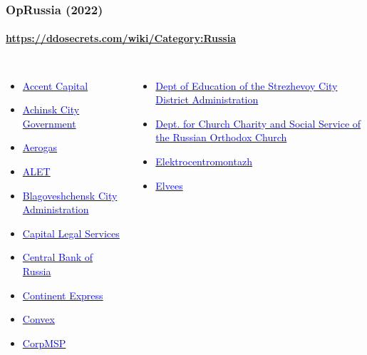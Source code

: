 \documentclass[aspectratio=169,usenames,dvipsnames]{beamer}
\begin{document}
\begin{frame}[t]
  \frametitle{OpRussia (2022)}
  \framesubtitle{\url{https://ddosecrets.com/wiki/Category:Russia}}

  \begin{columns}[T]
    \footnotesize
    \begin{itemize}
      \item \href{https://ddosecrets.com/wiki/Accent_Capital}{\textcolor{blue}{Accent Capital}}
      \item \href{https://ddosecrets.com/wiki/Achinsk_City_Government}{\textcolor{blue}{Achinsk City Government}}
      \item \href{https://ddosecrets.com/wiki/Aerogas}{\textcolor{blue}{Aerogas}}
      \item \href{https://ddosecrets.com/wiki/ALET}{\textcolor{blue}{ALET}}
      \item \href{https://ddosecrets.com/wiki/Blagoveshchensk_City_Administration}{\textcolor{blue}{Blagoveshchensk City Administration}}
      \item \href{https://ddosecrets.com/wiki/Capital_Legal_Services}{\textcolor{blue}{Capital Legal Services}}
      \item \href{https://ddosecrets.com/wiki/Central_Bank_of_Russia}{\textcolor{blue}{Central Bank of Russia}}
      \item \href{https://ddosecrets.com/wiki/Continent_Express}{\textcolor{blue}{Continent Express}}
      \item \href{https://ddosecrets.com/wiki/Convex}{\textcolor{blue}{Convex}}
      \item \href{https://ddosecrets.com/wiki/CorpMSP}{\textcolor{blue}{CorpMSP}}
    \end{itemize}
    \begin{itemize}
      \item \href{https://ddosecrets.com/wiki/Dept_of_Education_of_the_Strezhevoy_City_District_Administration}{\textcolor{blue}{Dept of Education of the Strezhevoy City District Administration}}
      \item \href{https://ddosecrets.com/wiki/Dept._for_Church_Charity_and_Social_Service_of_the_Russian_Orthodox_Church}{\textcolor{blue}{Dept. for Church Charity and Social Service of the Russian Orthodox Church}}
      \item \href{https://ddosecrets.com/wiki/Elektrocentromontazh}{\textcolor{blue}{Elektrocentromontazh}}
      \item \href{https://ddosecrets.com/wiki/Elvees}{\textcolor{blue}{Elvees}}

\end{itemize}
\end{columns}
\end{frame}
\end{document}
